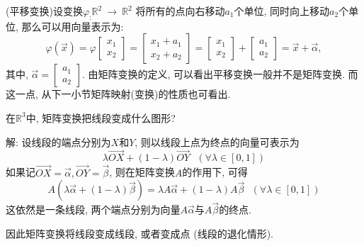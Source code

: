 \begin{eg}
(平移变换)设变换$\varphi_:  \mathbb{R}^2\ \rightarrow\ \mathbb{R}^2$ 将所有的点向右移动$a_1$个单位, 同时向上移动$a_2$个单位, 那么可以用向量表示为: \begin{displaymath}
\varphi(\vec{x})=\varphi\begin{bmatrix}x_1\\x_2\end{bmatrix}=\begin{bmatrix} x_1+a_1\\x_2+a_2\end{bmatrix}=\begin{bmatrix}x_1\\x_2\end{bmatrix}+\begin{bmatrix}
a_1\\a_2\end{bmatrix}=\vec{x}+\vec{\alpha},\end{displaymath}
其中, $\vec{\alpha}=\begin{bmatrix}a_1\\a_2\end{bmatrix}$. 由矩阵变换的定义, 可以看出平移变换一般并不是矩阵变换. 而这一点, 从下一小节矩阵映射(变换)的性质也可看出.
\end{eg}

\begin{eg}
在$\mathbb{R}^3$中, 矩阵变换把线段变成什么图形?
\end{eg}
解: 设线段的端点分别为$X$和$Y$, 则以线段上点为终点的向量可表示为
\begin{displaymath}
\lambda\vec{OX}+(1-\lambda)\vec{OY}\ \ \ (\forall \lambda\in[0,1])
\end{displaymath}
如果记$\vec{OX}=\vec{\alpha}, \vec{OY}=\vec{\beta}$, 则在矩阵变换$A$的作用下, 可得
\begin{displaymath}
A(\lambda\vec{\alpha}+(1-\lambda)\vec{\beta})=\lambda A\vec{\alpha}+(1-\lambda)A \vec{\beta}\ \ \ (\forall  \lambda\in[0,1])
\end{displaymath}
这依然是一条线段, 两个端点分别为向量$A\vec{\alpha}$与$A \vec{\beta}$的终点.

因此矩阵变换将线段变成线段, 或者变成点 (线段的退化情形).

